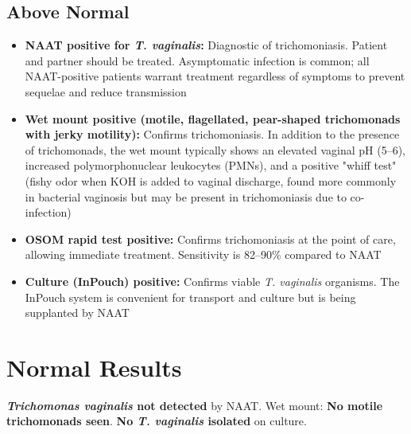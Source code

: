 \subsection*{Above Normal}
\begin{itemize}
  \item \textbf{NAAT positive for \textit{T. vaginalis}:} Diagnostic of trichomoniasis. Patient and partner should be treated. Asymptomatic infection is common; all NAAT-positive patients warrant treatment regardless of symptoms to prevent sequelae and reduce transmission
  \item \textbf{Wet mount positive (motile, flagellated, pear-shaped trichomonads with jerky motility):} Confirms trichomoniasis. In addition to the presence of trichomonads, the wet mount typically shows an elevated vaginal pH (5--6), increased polymorphonuclear leukocytes (PMNs), and a positive "whiff test" (fishy odor when KOH is added to vaginal discharge, found more commonly in bacterial vaginosis but may be present in trichomoniasis due to co-infection)
  \item \textbf{OSOM rapid test positive:} Confirms trichomoniasis at the point of care, allowing immediate treatment. Sensitivity is 82--90\% compared to NAAT
  \item \textbf{Culture (InPouch) positive:} Confirms viable \textit{T. vaginalis} organisms. The InPouch system is convenient for transport and culture but is being supplanted by NAAT
\end{itemize}

\section*{Normal Results}
\textbf{\textit{Trichomonas vaginalis} not detected} by NAAT. Wet mount: \textbf{No motile trichomonads seen}. \textbf{No \textit{T. vaginalis} isolated} on culture.


